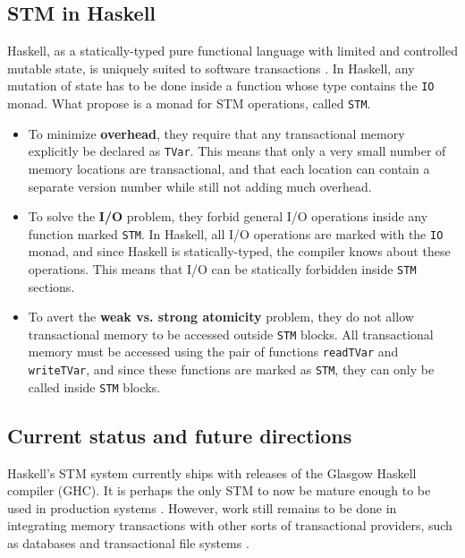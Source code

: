 \documentclass[a4paper]{acmtrans2m}
\begin{document}
\subsection{STM in Haskell}

Haskell, as a statically-typed pure functional language with limited and
controlled mutable state, is uniquely suited to software transactions
\cite{Harris:2005}. In Haskell, any mutation of state has to be done inside a
function whose type contains the \texttt{IO} monad. What 
propose is a monad for STM operations, called \texttt{STM}.

\begin{itemize}
\item To minimize \textbf{overhead}, they require that any transactional memory
  explicitly be declared as \texttt{TVar}. This means that only a very small
  number of memory locations are transactional, and that each location can contain
  a separate version number while still not adding much overhead.
\item To solve the \textbf{I/O} problem, they forbid general I/O operations inside
  any function marked \texttt{STM}. In Haskell, all I/O operations are marked with
  the \texttt{IO} monad, and since Haskell is statically-typed, the compiler knows
  about these operations. This means that I/O can be statically forbidden inside
  \texttt{STM} sections.
\item To avert the \textbf{weak vs. strong atomicity} problem, they do not allow
  transactional memory to be accessed outside \texttt{STM} blocks. All
  transactional memory must be accessed using the pair of functions
  \texttt{readTVar} and \texttt{writeTVar}, and since these functions are marked
  as \texttt{STM}, they can only be called inside \texttt{STM} blocks.
\end{itemize}

\subsection{Current status and future directions}

Haskell's STM system currently ships with releases of the Glasgow Haskell compiler (GHC).
It is perhaps the only STM to now be mature enough to be used in production systems
\cite{Stewart:2009}. However, work still remains to be done in integrating memory
transactions with other sorts of transactional providers, such as databases and
transactional file systems \cite{SPJ:2006}.
\end{document}
